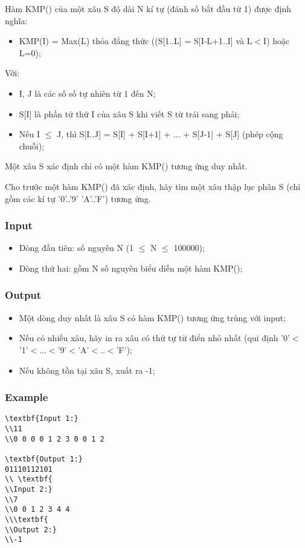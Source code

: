 



   Hàm KMP() của một xâu S độ dài N kí tự (đánh số bắt đầu từ 1) được định nghĩa:  
\begin{itemize}
	\item     KMP(I) = Max(L) thỏa đẳng thức ((S[1..L] = S[I-L+1..I] và L$<$I) hoặc L=0);   
\end{itemize}

   Với:  
\begin{itemize}
	\item     I, J là các số số tự nhiên từ 1 đến N;   
	\item     S[I] là phần tử thứ I của xâu S khi viết S từ trái sang phải;   
	\item     Nếu I $\le$ J, thì S[I..J] = S[I] + S[I+1] + ... + S[J-1] + S[J] (phép cộng chuỗi);   
\end{itemize}

   Một xâu S xác định chỉ có một hàm KMP() tương ứng duy nhất.  

   Cho trước một hàm KMP() đã xác định, hãy tìm một xâu thập lục phân S (chỉ gồm các kí tự '0'..'9' 'A'..'F') tương ứng.  

\subsubsection{   Input  }
\begin{itemize}
	\item     Dòng đầu tiên: số nguyên N (1  $\le$  N  $\le$  100000);   
	\item     Dòng thứ hai: gồm N số nguyên biểu diễn một hàm KMP();   
\end{itemize}

\subsubsection{   Output  }
\begin{itemize}
	\item     Một dòng duy nhất là xâu S có hàm KMP() tương ứng trùng với input;   
	\item     Nếu có nhiều xâu, hãy in ra xâu có thứ tự từ điển nhỏ nhất (qui định '0'$<$'1'$<$...$<$'9'$<$'A'$<$..$<$'F');   
	\item     Nếu không tồn tại xâu S, xuất ra -1;   
\end{itemize}

\subsubsection{   Example  }
\begin{verbatim}
\textbf{Input 1:}
\\11
\\0 0 0 0 1 2 3 0 0 1 2

\textbf{Output 1:}
01110112101
\\ \textbf{
\\Input 2:}
\\7
\\0 0 1 2 3 4 4
\\\textbf{
\\Output 2:}
\\-1\end{verbatim}
